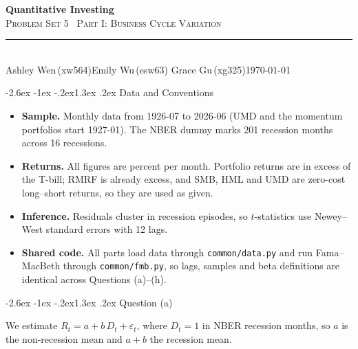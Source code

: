 \documentclass[11pt]{article}
\makeatletter
\renewcommand\section{\@startsection{section}{1}{0pt}%
  {-2.6ex \@plus -1ex \@minus -.2ex}{1.3ex \@plus .2ex}%
  {\normalfont\scshape\large\color{psink}}}   %
\newenvironment{tight}
  {\begin{itemize}\setlength{\itemsep}{3pt}\setlength{\parskip}{0pt}%
   \setlength{\topsep}{3pt}\setlength{\leftmargini}{1.4em}}
  {\end{itemize}}
\makeatother
\begin{document}
\thispagestyle{empty}
\begin{flushleft}
{\bfseries\LARGE\color{psink} Quantitative Investing}\\[3pt]
{\scshape\Large\color{psink} Problem Set 5 \textemdash\ Part I: Business Cycle Variation}\\[10pt]
{\color{psrule}\rule{\textwidth}{1.2pt}}\\[5pt]
{\small Ashley Wen\,(xw564)\quad\textbar\quad Emily Wu\,(esw63)%
\quad\textbar\quad Grace Gu\,(xg325)\hfill \today}
\end{flushleft}

\vspace{1.4em}

\section{Data and Conventions}

\begin{tight}
  \item \textbf{Sample.} Monthly data from 1926-07 to 2026-06 (UMD and the momentum
  portfolios start 1927-01). The NBER dummy marks 201 recession months across 16 recessions.
  \item \textbf{Returns.} All figures are percent per month. Portfolio returns are in
  excess of the T-bill; RMRF is already excess, and SMB, HML and UMD are zero-cost
  long--short returns, so they are used as given.
  \item \textbf{Inference.} Residuals cluster in recession episodes, so $t$-statistics
  use Newey--West standard errors with 12 lags.
  \item \textbf{Shared code.} All parts load data through \texttt{common/data.py} and run
  Fama--MacBeth through \texttt{common/fmb.py}, so lags, samples and beta definitions
  are identical across Questions (a)--(h).
\end{tight}

\section{Question (a)}

We estimate $R_t = a + b\,D_t + \varepsilon_t$, where $D_t = 1$ in NBER recession months,
so $a$ is the non-recession mean and $a+b$ the recession mean.
\end{document}

